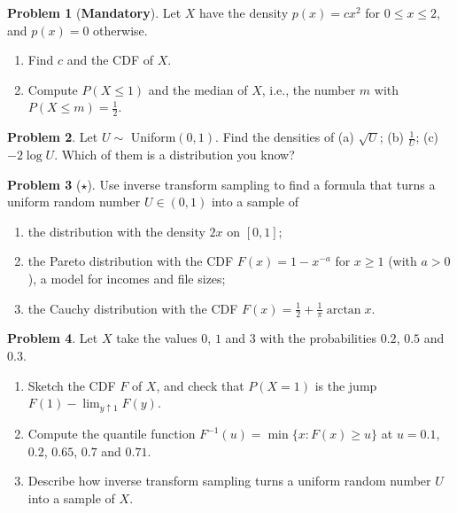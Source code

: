 \documentclass[11pt]{article}
\theoremstyle{definition}
\newtheorem{problem}{Problem}[section]
\newcommand{\mandatory}{\textcolor{red!70!black}{\textbf{Mandatory}}}
\begin{document}
\begin{problem}[\mandatory]\label{pr:density}
    Let $X$ have the density $p(x) = cx^2$ for $0 \leq x \leq 2$, and $p(x) = 0$ otherwise.
    \begin{enumerate}[label=(\alph*)]
        \item Find $c$ and the CDF of $X$.
        \item Compute $P(X \leq 1)$ and the median of $X$, i.e., the number $m$ with $P(X \leq m) = \frac{1}{2}$.
    \end{enumerate}
\end{problem}

\begin{problem}\label{pr:transformations}
    Let $U \sim$ Uniform$(0, 1)$. Find the densities of (a) $\sqrt{U}$; (b) $\frac{1}{U}$; (c) $-2\log U$. Which of them is a distribution you know?
\end{problem}

\begin{problem}[$\star$]\label{pr:inverse-transform}
    Use inverse transform sampling to find a formula that turns a uniform random number $U \in (0, 1)$ into a sample of
    \begin{enumerate}[label=(\alph*)]
        \item the distribution with the density $2x$ on $[0, 1]$;
        \item the Pareto distribution with the CDF $F(x) = 1 - x^{-a}$ for $x \geq 1$ (with $a > 0$), a model for incomes and file sizes;
        \item the Cauchy distribution with the CDF $F(x) = \frac{1}{2} + \frac{1}{\pi}\arctan x$.
    \end{enumerate}
\end{problem}

\begin{problem}\label{pr:quantile}
    Let $X$ take the values $0$, $1$ and $3$ with the probabilities $0.2$, $0.5$ and $0.3$.
    \begin{enumerate}[label=(\alph*)]
        \item Sketch the CDF $F$ of $X$, and check that $P(X = 1)$ is the jump $F(1) - \lim_{y \uparrow 1}F(y)$.
        \item Compute the quantile function $F^{-1}(u) = \min\{x : F(x) \geq u\}$ at $u = 0.1$, $0.2$, $0.65$, $0.7$ and $0.71$.
        \item Describe how inverse transform sampling turns a uniform random number $U$ into a sample of $X$.
    \end{enumerate}
\end{problem}
\end{document}
